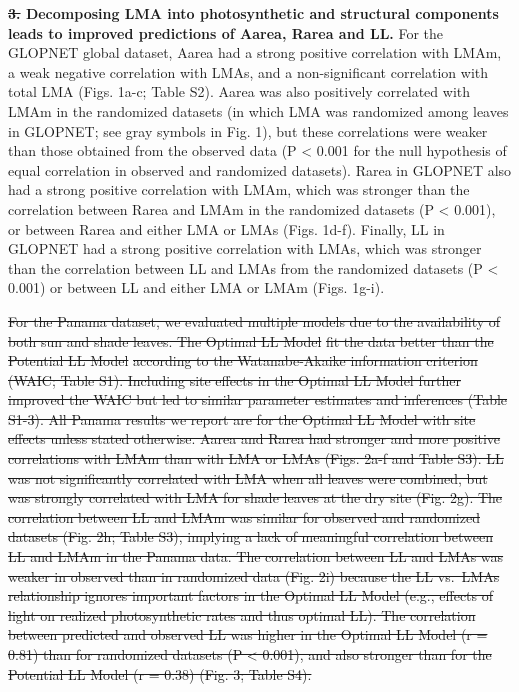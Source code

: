 \documentclass[12pt,]{article}
\theoremstyle{definition}
\theoremstyle{definition}
\theoremstyle{definition}
\theoremstyle{remark}
\providecommand{\DIFaddtex}[1]{{\protect\color{blue}\uwave{#1}}} %
\providecommand{\DIFdeltex}[1]{{\protect\color{red}\sout{#1}}}                      %
\providecommand{\DIFaddbegin}{} %
\providecommand{\DIFaddend}{} %
\providecommand{\DIFdelbegin}{} %
\providecommand{\DIFdelend}{} %
\providecommand{\DIFadd}[1]{\texorpdfstring{\DIFaddtex{#1}}{#1}} %
\providecommand{\DIFdel}[1]{\texorpdfstring{\DIFdeltex{#1}}{}} %
\newcommand{\DIFscaledelfig}{0.5}
\newlength{\DIFdelgraphicswidth} %
\newlength{\DIFdelgraphicsheight} %
\newcommand{\DIFaddincludegraphics}[2][]{{\color{blue}\fbox{\DIFOincludegraphics[#1]{#2}}}} %
\newcommand{\DIFdelincludegraphics}[2][]{%
\sbox{\DIFdelgraphicsbox}{\DIFOincludegraphics[#1]{#2}}%
\settoboxwidth{\DIFdelgraphicswidth}{\DIFdelgraphicsbox} %
\settoboxtotalheight{\DIFdelgraphicsheight}{\DIFdelgraphicsbox} %
\scalebox{\DIFscaledelfig}{%
\parbox[b]{\DIFdelgraphicswidth}{\usebox{\DIFdelgraphicsbox}\\[-\baselineskip] \rule{\DIFdelgraphicswidth}{0em}}\llap{\resizebox{\DIFdelgraphicswidth}{\DIFdelgraphicsheight}{%
\setlength{\unitlength}{\DIFdelgraphicswidth}%
\begin{picture}(1,1)%
\thicklines\linethickness{2pt} %
{\color[rgb]{1,0,0}\put(0,0){\framebox(1,1){}}}%
{\color[rgb]{1,0,0}\put(0,0){\line( 1,1){1}}}%
{\color[rgb]{1,0,0}\put(0,1){\line(1,-1){1}}}%
\end{picture}%
}\hspace*{3pt}}} %
} %
\DeclareRobustCommand{\DIFaddbegin}{\DIFOaddbegin \let\includegraphics\DIFaddincludegraphics} %
\DeclareRobustCommand{\DIFaddend}{\DIFOaddend \let\includegraphics\DIFOincludegraphics} %
\DeclareRobustCommand{\DIFdelbegin}{\DIFOdelbegin \let\includegraphics\DIFdelincludegraphics} %
\DeclareRobustCommand{\DIFdelend}{\DIFOaddend \let\includegraphics\DIFOincludegraphics} %
\begin{document}
\begin{itemize}
\textbf{\DIFdelbegin \DIFdel{3. }\DIFdelend \DIFaddbegin \DIFadd{2. }\DIFaddend Decomposing LMA into photosynthetic and structural components
leads to improved predictions of Aarea, Rarea and LL.} For the GLOPNET
global dataset, Aarea had a strong positive correlation with LMAm, a
weak negative correlation with LMAs, and a non-significant correlation
with total LMA (Figs. 1a-c; Table S2). Aarea was also positively
correlated with LMAm in the randomized datasets (in which LMA was
randomized among leaves in GLOPNET; see gray symbols in Fig. 1), but
these correlations were weaker than those obtained from the observed
data (P \textless{} 0.001 for the null hypothesis of equal correlation
in observed and randomized datasets). Rarea in GLOPNET also had a strong
positive correlation with LMAm, which was stronger than the correlation
between Rarea and LMAm in the randomized datasets (P \textless{} 0.001),
or between Rarea and either LMA or LMAs (Figs. 1d-f). Finally, LL in
GLOPNET had a strong positive correlation with LMAs, which was stronger
than the correlation between LL and LMAs from the randomized datasets (P
\textless{} 0.001) or between LL and either LMA or LMAm (Figs. 1g-i).

\DIFdelbegin \DIFdel{For the Panama dataset, we evaluated multiple models due to the
availability of both sun and shade leaves. The Optimal LL Model
}%
\DIFdel{fit the data better than the Potential LL Model
}%
\DIFdel{according to the Watanabe-Akaike information criterion
(WAIC; Table S1). Including site effects in the Optimal LL Model further
improved the WAIC but led to similar parameter estimates and inferences
(Table S1-3). All Panama results we report are for the Optimal LL Model
with site effects unless stated otherwise. Aarea and Rarea had stronger
and more positive correlations with LMAm than with LMA or LMAs (Figs.
2a-f and Table S3). LL was not significantly correlated with LMA when
all leaves were combined, but was strongly correlated with LMA for shade
leaves at the dry site (Fig. 2g). The correlation between LL and LMAm
was similar for observed and randomized datasets (Fig. 2h; Table S3),
implying a lack of meaningful correlation between LL and LMAm in the
Panama data. The correlation between LL and LMAs was weaker in observed
than in randomized data (Fig. 2i) because the LL vs.~LMAs relationship
ignores important factors in the Optimal LL Model (e.g., effects of
light on realized photosynthetic rates and thus optimal LL). The
correlation between predicted and observed LL was higher in the Optimal
LL Model (r = 0.81) than for randomized datasets (P \textless{} 0.001),
and also stronger than for the Potential LL Model (r = 0.38) (Fig. 3;
Table S4).
}%


\end{itemize}
\end{document}
